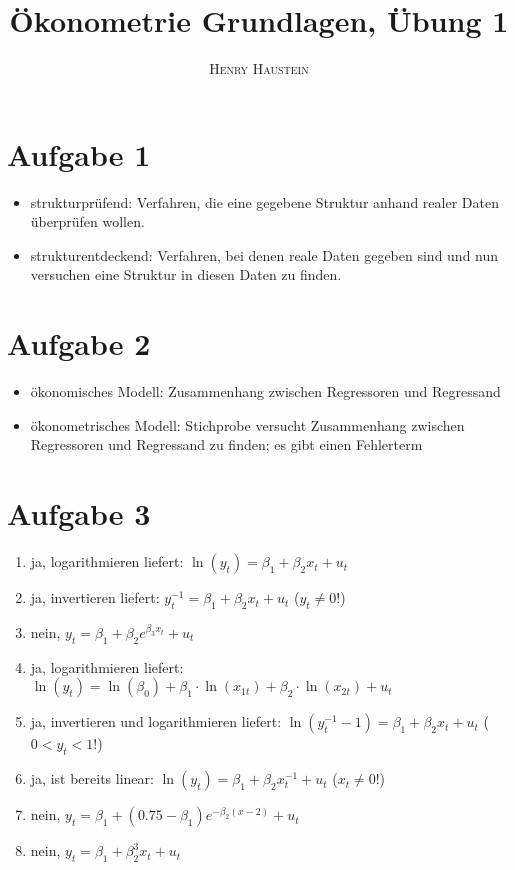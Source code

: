 \documentclass{article}
\title{\textbf{Ökonometrie Grundlagen, Übung 1}}
\author{\textsc{Henry Haustein}}
\date{}
\begin{document}
	\maketitle
	
	\section*{Aufgabe 1}
	\begin{itemize}
		\item strukturprüfend: Verfahren, die eine gegebene Struktur anhand realer Daten überprüfen wollen.
		\item strukturentdeckend: Verfahren, bei denen reale Daten gegeben sind und nun versuchen eine Struktur in diesen Daten zu finden.
	\end{itemize}
	
	\section*{Aufgabe 2}
	\begin{itemize}
		\item ökonomisches Modell: Zusammenhang zwischen Regressoren und Regressand
		\item ökonometrisches Modell: Stichprobe versucht Zusammenhang zwischen Regressoren und Regressand zu finden; es gibt einen Fehlerterm
	\end{itemize}
	
	\section*{Aufgabe 3}
	\begin{enumerate}[label=(\alph*)]
		\item ja, logarithmieren liefert: $\ln(y_t) = \beta_1 + \beta_2x_t + u_t$
		\item ja, invertieren liefert: $y_t^{-1} = \beta_1 + \beta_2x_t + u_t$ ($y_t\neq 0$!)
		\item nein, $y_t = \beta_1 + \beta_2e^{\beta_3x_t} + u_t$
		\item ja, logarithmieren liefert: $\ln(y_t) = \ln(\beta_0) + \beta_1 \cdot\ln(x_{1t}) + \beta_2\cdot\ln(x_{2t}) + u_t$
		\item ja, invertieren und logarithmieren liefert: $\ln(y_t^{-1}-1)=\beta_1 + \beta_2x_t + u_t$ ($0<y_t<1$!)
		\item ja, ist bereits linear: $\ln(y_t) = \beta_1 + \beta_2x_t^{-1} + u_t$ ($x_t\neq 0$!)
		\item nein, $y_t=\beta_1 + (0.75-\beta_1)e^{-\beta_2(x-2)} + u_t$
		\item nein, $y_t=\beta_1 + \beta_2^3 x_t + u_t$
	\end{enumerate}
	
\end{document}
